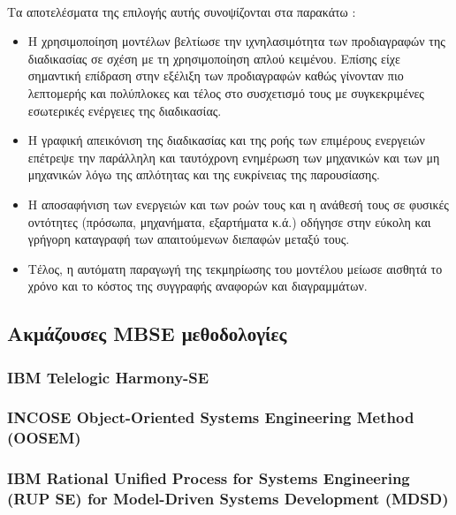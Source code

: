 \documentclass[a4paper,12pt,twoside]{report}
\begin{document}
{				\paragraph{} {Τα αποτελέσματα της επιλογής αυτής συνοψίζονται στα παρακάτω :}
				\begin{itemize}
					\item Η χρησιμοποίηση μοντέλων βελτίωσε την ιχνηλασιμότητα  των προδιαγραφών της διαδικασίας σε σχέση με τη χρησιμοποίηση απλού κειμένου. Επίσης είχε σημαντική επίδραση στην εξέλιξη των προδιαγραφών καθώς γίνονταν πιο λεπτομερής και πολύπλοκες και τέλος στο συσχετισμό τους με συγκεκριμένες εσωτερικές ενέργειες της διαδικασίας.
					\item Η γραφική απεικόνιση της διαδικασίας και της ροής των επιμέρους ενεργειών επέτρεψε την παράλληλη και ταυτόχρονη ενημέρωση των μηχανικών και των μη μηχανικών λόγω της απλότητας και της ευκρίνειας της παρουσίασης.
					\item Η αποσαφήνιση των ενεργειών και των ροών τους και η ανάθεσή τους σε φυσικές οντότητες (πρόσωπα, μηχανήματα, εξαρτήματα κ.ά.) οδήγησε στην εύκολη και γρήγορη καταγραφή των απαιτούμενων διεπαφών μεταξύ τους.
					\item Τέλος, η αυτόματη παραγωγή της τεκμηρίωσης του μοντέλου μείωσε αισθητά το χρόνο και το κόστος της συγγραφής αναφορών και διαγραμμάτων.
				\end{itemize}
				
		\subsection{Ακμάζουσες MBSE μεθοδολογίες}
		
			\subsubsection{IBM Telelogic Harmony-SE}
			\subsubsection{INCOSE Object-Oriented Systems Engineering Method (OOSEM)}
			\subsubsection{IBM Rational Unified Process for Systems Engineering (RUP SE) for Model-Driven Systems Development (MDSD)}
}
\end{document}
